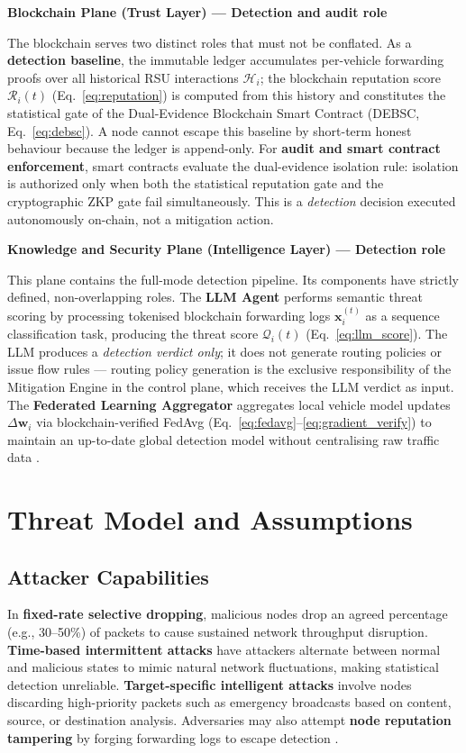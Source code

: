 \documentclass[12pt, a4paper]{report}
\newcommand{\mypar}{\vspace{0.8em}\noindent}
\begin{document}
\mypar
\textbf{Blockchain Plane (Trust Layer) — Detection and audit role}

\mypar
The blockchain serves two distinct roles that must not be conflated.
As a \textbf{detection baseline}, the immutable ledger accumulates per-vehicle forwarding proofs over all historical RSU interactions $\mathcal{H}_i$; the blockchain reputation score $\mathcal{R}_i(t)$ (Eq.~\eqref{eq:reputation}) is computed from this history and constitutes the statistical gate of the Dual-Evidence Blockchain Smart Contract (DEBSC, Eq.~\eqref{eq:debsc}). A node cannot escape this baseline by short-term honest behaviour because the ledger is append-only.
For \textbf{audit and smart contract enforcement}, smart contracts evaluate the dual-evidence isolation rule: isolation is authorized only when both the statistical reputation gate and the cryptographic ZKP gate fail simultaneously. This is a \emph{detection} decision executed autonomously on-chain, not a mitigation action.

\mypar
\textbf{Knowledge and Security Plane (Intelligence Layer) — Detection role}

\mypar
This plane contains the full-mode detection pipeline. Its components have strictly defined, non-overlapping roles.
The \textbf{LLM Agent} performs semantic threat scoring by processing tokenised blockchain forwarding logs $\mathbf{x}_i^{(t)}$ as a sequence classification task, producing the threat score $\mathcal{Q}_i(t)$ (Eq.~\eqref{eq:llm_score}). The LLM produces a \emph{detection verdict only}; it does not generate routing policies or issue flow rules — routing policy generation is the exclusive responsibility of the Mitigation Engine in the control plane, which receives the LLM verdict as input.
The \textbf{Federated Learning Aggregator} aggregates local vehicle model updates $\Delta\mathbf{w}_i$ via blockchain-verified FedAvg (Eq.~\eqref{eq:fedavg}--\eqref{eq:gradient_verify}) to maintain an up-to-date global detection model without centralising raw traffic data \cite{yurdem2024}.

\section{Threat Model and Assumptions}

\subsection{Attacker Capabilities}

In \textbf{fixed-rate selective dropping}, malicious nodes drop an agreed percentage (e.g., 30--50\%) of packets to cause sustained network throughput disruption.
\textbf{Time-based intermittent attacks} have attackers alternate between normal and malicious states to mimic natural network fluctuations, making statistical detection unreliable.
\textbf{Target-specific intelligent attacks} involve nodes discarding high-priority packets such as emergency broadcasts based on content, source, or destination analysis.
Adversaries may also attempt \textbf{node reputation tampering} by forging forwarding logs to escape detection \cite{sahu2024}.
\end{document}
